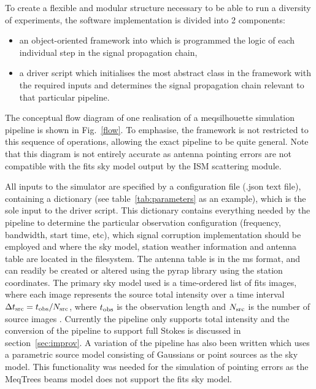 To create a flexible and modular structure necessary to be able to run a diversity of experiments, the software implementation is divided into 2 components:
\begin{itemize}
 \item an object-oriented framework into which is programmed the logic of each individual step in the signal propagation chain,
 \item a driver script which initialises the most abstract class in the framework with the required inputs and determines the signal propagation chain relevant to that particular pipeline.
\end{itemize}
The conceptual flow diagram of one realisation of a {\sc meqsilhouette} simulation pipeline is shown in Fig.~\ref{flow}. To emphasise, the framework is not restricted to this sequence of operations, allowing the exact pipeline to be quite general. Note that this diagram is not entirely accurate as antenna pointing errors are not compatible with the {\sc fits} sky model output by the ISM scattering module.


All inputs to the simulator are specified by a configuration file (.json text file), containing a dictionary (see table~\ref{tab:parameters} as an example), which is the sole input to the driver script. This dictionary contains everything needed by the pipeline to determine the particular observation configuration (frequency, bandwidth, start time, etc), which signal corruption implementation should be employed and where the sky model, station weather information and antenna table are located in the filesystem. The antenna table is in the {\sc ms} format, and can readily be created or altered using the {\sc pyrap} library using the station coordinates. The primary sky model used is a time-ordered list of {\sc fits} images, where each image represents the source total intensity over a time interval $\Delta t_{\rm src} = t_{\rm obs}/N_{\rm src}$, where $t_{\rm obs}$ is the observation length and $N_{\rm src}$ is the number of source images \citep{Blecher_2016}. Currently the pipeline only supports total intensity and the conversion of the pipeline to support full Stokes is discussed in section~\ref{sec:improv}. A variation of the pipeline has also been written which uses a parametric source model consisting of Gaussians or point sources as the sky model. This functionality was needed for the simulation of pointing errors as the {\sc MeqTrees} beams model does not support the {\sc fits} sky model. 

